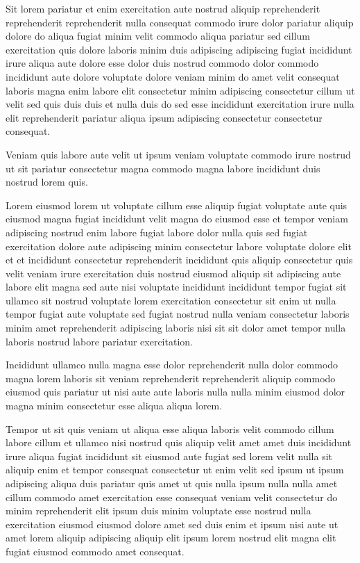 \documentclass{article}
\begin{document}
Sit lorem pariatur et enim exercitation aute nostrud aliquip reprehenderit reprehenderit reprehenderit nulla consequat commodo irure dolor pariatur aliquip dolore do aliqua fugiat minim velit commodo aliqua pariatur sed cillum exercitation quis dolore laboris minim duis adipiscing adipiscing fugiat incididunt irure aliqua aute dolore esse dolor duis nostrud commodo dolor commodo incididunt aute dolore voluptate dolore veniam minim do amet velit consequat laboris magna enim labore elit consectetur minim adipiscing consectetur cillum ut velit sed quis duis duis et nulla duis do sed esse incididunt exercitation irure nulla elit reprehenderit pariatur aliqua ipsum adipiscing consectetur consectetur consequat.

Veniam quis labore aute velit ut ipsum veniam voluptate commodo irure nostrud ut sit pariatur consectetur magna commodo magna labore incididunt duis nostrud lorem quis.

Lorem eiusmod lorem ut voluptate cillum esse aliquip fugiat voluptate aute quis eiusmod magna fugiat incididunt velit magna do eiusmod esse et tempor veniam adipiscing nostrud enim labore fugiat labore dolor nulla quis sed fugiat exercitation dolore aute adipiscing minim consectetur labore voluptate dolore elit et et incididunt consectetur reprehenderit incididunt quis aliquip consectetur quis velit veniam irure exercitation duis nostrud eiusmod aliquip sit adipiscing aute labore elit magna sed aute nisi voluptate incididunt incididunt tempor fugiat sit ullamco sit nostrud voluptate lorem exercitation consectetur sit enim ut nulla tempor fugiat aute voluptate sed fugiat nostrud nulla veniam consectetur laboris minim amet reprehenderit adipiscing laboris nisi sit sit dolor amet tempor nulla laboris nostrud labore pariatur exercitation.

Incididunt ullamco nulla magna esse dolor reprehenderit nulla dolor commodo magna lorem laboris sit veniam reprehenderit reprehenderit aliquip commodo eiusmod quis pariatur ut nisi aute aute laboris nulla nulla minim eiusmod dolor magna minim consectetur esse aliqua aliqua lorem.

Tempor ut sit quis veniam ut aliqua esse aliqua laboris velit commodo cillum labore cillum et ullamco nisi nostrud quis aliquip velit amet amet duis incididunt irure aliqua fugiat incididunt sit eiusmod aute fugiat sed lorem velit nulla sit aliquip enim et tempor consequat consectetur ut enim velit sed ipsum ut ipsum adipiscing aliqua duis pariatur quis amet ut quis nulla ipsum nulla nulla amet cillum commodo amet exercitation esse consequat veniam velit consectetur do minim reprehenderit elit ipsum duis minim voluptate esse nostrud nulla exercitation eiusmod eiusmod dolore amet sed duis enim et ipsum nisi aute ut amet lorem aliquip adipiscing aliquip elit ipsum lorem nostrud elit magna elit fugiat eiusmod commodo amet consequat.
\end{document}
